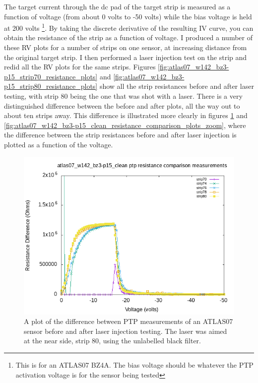 \documentclass{report}
\begin{document}
            The target current through the dc pad of the target strip is measured as a function of voltage (from about 0 volts to -50 volts) while the bias voltage is held at 200 volts \footnote{This is for an ATLAS07 BZ4A. The bias voltage should be whatever the PTP activation voltage is for the sensor being tested}. By taking the discrete derivative of the resulting IV curve, you can obtain the resistance of the strip as a function of voltage. I produced a number of these RV plots for a number of strips on one sensor, at increasing distance from the original target strip. I then performed a laser injection test on the strip and redid all the RV plots for the same strips. Figures \ref{fig:atlas07_w142_bz3-p15_strip70_resistance_plots} and \ref{fig:atlas07_w142_bz3-p15_strip80_resistance_plots} show all the strip resistances before and after laser testing, with strip 80 being the one that was shot with a laser. There is a very distinguished difference between the before and after plots, all the way out to about ten strips away. This difference is illustrated more clearly in figures \ref{fig:atlas07_w142_bz3-p15_clean_resistance_comparison_plots_base} and \ref{fig:atlas07_w142_bz3-p15_clean_resistance_comparison_plots_zoom}, where the difference between the strip resistances before and after laser injection is plotted as a function of the voltage.

            \begin{figure}[h] 
                \includegraphics[height=.4\textheight]{atlas07_w142_bz3-p15_clean_resistance_comparison_plots_base}
                \centering
                \caption{ A plot of the difference between PTP measurements of an ATLAS07 sensor before and after laser injection testing. The laser was aimed at the near side, strip 80, using the unlabelled black filter. }
                \label{fig:atlas07_w142_bz3-p15_clean_resistance_comparison_plots_base}
            \end{figure}
\end{document}
